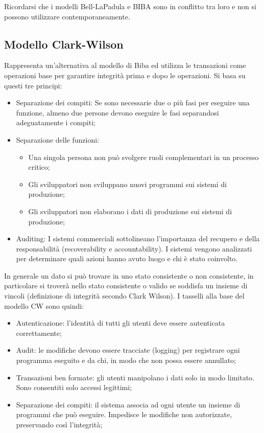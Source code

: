 Ricordarsi che i modelli Bell-LaPadula e BIBA sono in conflitto tra loro e 
non si possono utilizzare
contemporaneamente.

\subsection{Modello Clark-Wilson}

Rappresenta un’alternativa al modello di Biba ed utilizza le transazioni come 
operazioni base per
garantire integrità prima e dopo le operazioni.
Si basa su questi tre principi:

\begin{itemize}
      \item Separazione dei compiti: Se sono necessarie due o più fasi per
            eseguire una funzione,
            almeno due persone devono eseguire le fasi separandosi adeguatamente 
            i compiti;
      \item Separazione delle funzioni:
            \begin{itemize}
                  \item Una singola persona non può svolgere ruoli complementari
                        in un processo critico;
                  \item Gli sviluppatori non sviluppano nuovi programmi sui
                        sistemi di produzione;
                  \item Gli sviluppatori non elaborano i dati di produzione sui
                        sistemi di produzione;
            \end{itemize}
      \item Auditing: I sistemi commerciali sottolineano l’importanza del
            recupero e della responsabilità
            (recoverability e accountability). I sistemi vengono analizzati per 
            determinare quali azioni
            hanno avuto luogo e chi è stato coinvolto.
\end{itemize}

In generale un dato si può trovare in uno stato consistente o non consistente, 
in particolare si
troverà nello stato consistente o valido se soddisfa un insieme di vincoli 
(definizione di integrità
secondo Clark Wilson).
I tasselli alla base del modello CW sono quindi:

\begin{itemize}
      \item Autenticazione: l'identità di tutti gli utenti deve essere
            autenticata correttamente;
      \item Audit: le modifiche devono essere tracciate (logging) per registrare ogni
            programma eseguito e da chi,
            in modo che non possa essere annullato;
      \item Transazioni ben formate: gli utenti manipolano i dati solo in modo
            limitato. Sono consentiti
            solo accessi legittimi;
      \item Separazione dei compiti: il sistema associa ad ogni utente un
            insieme di programmi che
            può eseguire. Impedisce le modifiche non autorizzate, preservando 
            così l'integrità;
\end{itemize}

